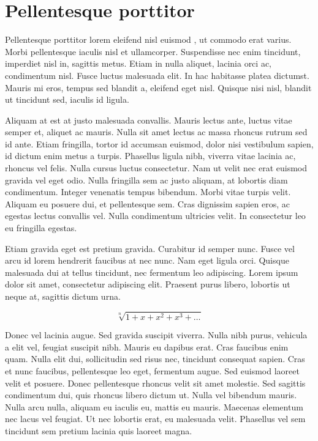 \chapter{Pellentesque porttitor}

Pellentesque porttitor lorem eleifend nisl euismod \cite{vecchi1983}, ut commodo erat varius. Morbi pellentesque iaculis nisl et ullamcorper. Suspendisse nec enim tincidunt, imperdiet nisl in, sagittis metus. Etiam in nulla aliquet, lacinia orci ac, condimentum nisl. Fusce luctus malesuada elit. In hac habitasse platea dictumst. Mauris mi eros, tempus sed blandit a, eleifend eget nisl. Quisque nisi nisl, blandit ut tincidunt sed, iaculis id ligula.

Aliquam at est at justo malesuada convallis. Mauris lectus ante, luctus vitae semper et, aliquet ac mauris. Nulla sit amet lectus ac massa rhoncus rutrum sed id ante. Etiam fringilla, tortor id accumsan euismod, dolor nisi vestibulum sapien, id dictum enim metus a turpis. Phasellus ligula nibh, viverra vitae lacinia ac, rhoncus vel felis. Nulla cursus luctus consectetur. Nam ut velit nec erat euismod gravida vel eget odio. Nulla fringilla sem ac justo aliquam, at lobortis diam condimentum. Integer venenatis tempus bibendum. Morbi vitae turpis velit. Aliquam eu posuere dui, et pellentesque sem. Cras dignissim sapien eros, ac egestas lectus convallis vel. Nulla condimentum ultricies velit. In consectetur leo eu fringilla egestas. 

Etiam gravida eget est pretium gravida. Curabitur id semper nunc. Fusce vel arcu id lorem hendrerit faucibus at nec nunc. Nam eget ligula orci. Quisque malesuada dui at tellus tincidunt, nec fermentum leo adipiscing. Lorem ipsum dolor sit amet, consectetur adipiscing elit. Praesent purus libero, lobortis ut neque at, sagittis dictum urna.

\begin{equation}
\sqrt[n]{1+x+x^2+x^3+\ldots}
\end{equation}

Donec vel lacinia augue. Sed gravida suscipit viverra. Nulla nibh purus, vehicula a elit vel, feugiat suscipit nibh. Mauris eu dapibus erat. Cras faucibus enim quam. Nulla elit dui, sollicitudin sed risus nec, tincidunt consequat sapien. Cras et nunc faucibus, pellentesque leo eget, fermentum augue. Sed euismod laoreet velit et posuere. Donec pellentesque rhoncus velit sit amet molestie. Sed sagittis condimentum dui, quis rhoncus libero dictum ut. Nulla vel bibendum mauris. Nulla arcu nulla, aliquam eu iaculis eu, mattis eu mauris. Maecenas elementum nec lacus vel feugiat. Ut nec lobortis erat, eu malesuada velit. Phasellus vel sem tincidunt sem pretium lacinia quis laoreet magna.

